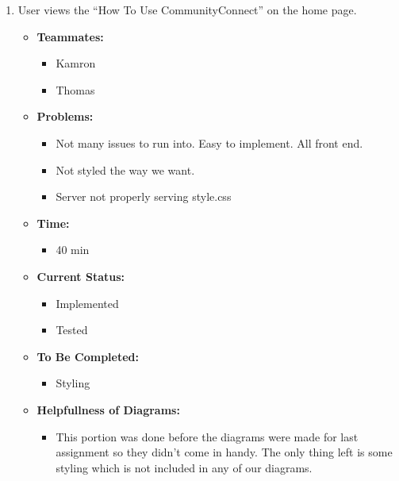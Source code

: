 \documentclass[12pt]{article}
\begin{document}
  \begin{enumerate}
    \item User views the “How To Use CommunityConnect” on the home page.
      \begin{itemize}
        \item \textbf{Teammates:}
          \begin{itemize}
            \item Kamron
            \item Thomas
          \end{itemize}
        \item \textbf{Problems:}
          \begin{itemize}
            \item Not many issues to run into. Easy to implement. All front end.
            \item Not styled the way we want.
            \item Server not properly serving style.css
          \end{itemize}
        \item \textbf{Time:}
          \begin{itemize}
            \item 40 min
          \end{itemize}
        \item \textbf{Current Status:}
          \begin{itemize}
            \item Implemented
            \item Tested
          \end{itemize}
        \item \textbf{To Be Completed:}
          \begin{itemize}
            \item Styling
          \end{itemize}
        \item \textbf{Helpfullness of Diagrams:}
          \begin{itemize}
            \item This portion was done before the diagrams were made for last assignment so they didn’t come in handy. The only thing left is some styling which is not included in any of our diagrams.
          \end{itemize}
      \end{itemize}


\end{enumerate}
\end{document}
